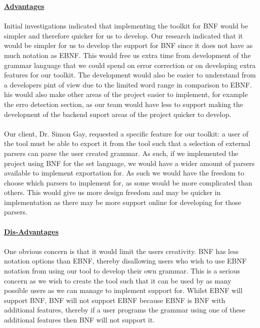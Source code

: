 \textbf {\underline{Advantages}}\\
\\
 Initial investigations indicated that implementing the toolkit for BNF would be simpler and therefore quicker for us to develop. Our research indicated that it would be simpler for us to develop the support for BNF since it does not have as much notation as EBNF. This would free us extra time from development of the grammar language that we could spend on error correction or on developing extra features for our toolkit. The development would also be easier to understand from a developers pint of view due to the limited word range in comparison to EBNF. his would also make other areas of the project easier to implement, for example the erro detection section, as our team would have less to support making the developnent of the backend suport areas of the project quicker to develop. \\
\\
Our client, Dr. Simon Gay, requested a specific feature for our toolkit: a user of the tool must be able to export it from the tool such that a selection of external parsers can parse the user created grammar. As such, if we implemented the project using BNF for the set language, we would have a wider amount of parsers available to implement exportation for. As such we would have the freedom to choose which parsers to implement for, as some would be more complicated than others. This would give us more design freedom and may be quicker in implementation as there may be more support online for developing for those parsers.\\
\\
\textbf {\underline{Dis-Advantages}}\\
\\
One obvious concern is that it would limit the users creativity. BNF has less notation options than EBNF, thereby disallowing users who wish to use EBNF notation from using our tool to develop their own grammar. This is a serious concern as we wish to create the tool such that it can be used by as many possible users as we can manage to implement support for. Whilst EBNF will support BNF, BNF will not support EBNF because EBNF is BNF with additional features, thereby if a user programs the grammar using one of these additional features then BNF will not support it.\\
\\
